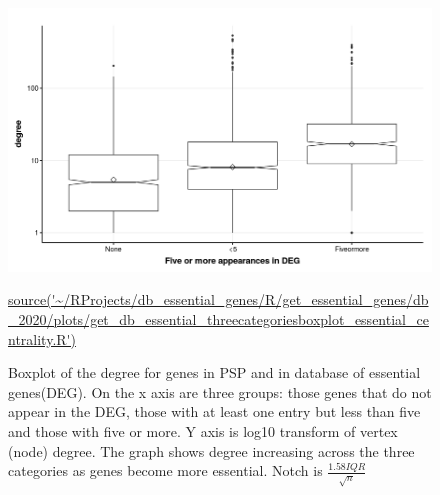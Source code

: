 \begin{figure}
    \centering
    \includegraphics[width=\textwidth]{images/chapter3/ggplot2/db_essential_genes/theme/Rplot_single_boxplot_three_categories.png}
    \caption{Boxplot of the degree for genes in PSP and in database of essential genes(DEG). On the x axis are three groups: those genes that do not appear in the DEG, those with at least one entry but less than five and those with five or more. Y axis is log10 transform of vertex (node) degree. The graph shows degree increasing across the three categories as genes become more essential. Notch is $\frac{1.58 IQR}{\sqrt{n}}$}
    \tiny\url{source('~/RProjects/db_essential_genes/R/get_essential_genes/db_2020/plots/get_db_essential_threecategoriesboxplot_essential_centrality.R')}
    \label{fig:boxplot_three_groups_DEG_logdegree1}
\end{figure}




